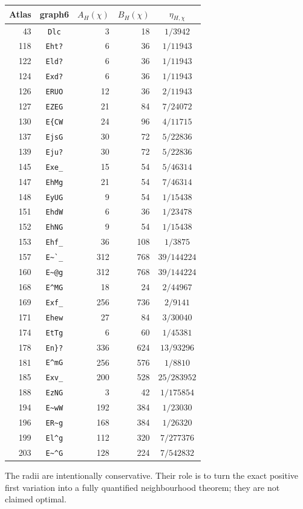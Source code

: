 \documentclass[11pt]{article}
\begin{document}
\begin{center}
\begin{tabular}{r|c|r|r|c}
Atlas&graph6&$A_H(\chi)$&$B_H(\chi)$&$\eta_{H,\chi}$\\ \hline
43&\verb|Dlc|&3&18&$1/3942$\\
118&\verb|Eht?|&6&36&$1/11943$\\
122&\verb|Eld?|&6&36&$1/11943$\\
124&\verb|Exd?|&6&36&$1/11943$\\
126&\verb|ERUO|&12&36&$2/11943$\\
127&\verb|EZEG|&21&84&$7/24072$\\
130&\verb|E{CW|&24&96&$4/11715$\\
137&\verb|EjsG|&30&72&$5/22836$\\
139&\verb|Eju?|&30&72&$5/22836$\\
145&\verb|Exe_|&15&54&$5/46314$\\
147&\verb|EhMg|&21&54&$7/46314$\\
148&\verb|EyUG|&9&54&$1/15438$\\
151&\verb|EhdW|&6&36&$1/23478$\\
152&\verb|EhNG|&9&54&$1/15438$\\
153&\verb|Ehf_|&36&108&$1/3875$\\
157&\verb|E~`_|&312&768&$39/144224$\\
160&\verb|E~@g|&312&768&$39/144224$\\
168&\verb|E^MG|&18&24&$2/44967$\\
169&\verb|Exf_|&256&736&$2/9141$\\
171&\verb|Ehew|&27&84&$3/30040$\\
174&\verb|EtTg|&6&60&$1/45381$\\
178&\verb|En}?|&336&624&$13/93296$\\
181&\verb|E^mG|&256&576&$1/8810$\\
185&\verb|Exv_|&200&528&$25/283952$\\
188&\verb|EzNG|&3&42&$1/175854$\\
194&\verb|E~wW|&192&384&$1/23030$\\
196&\verb|ER~g|&168&384&$1/26320$\\
199&\verb|El^g|&112&320&$7/277376$\\
203&\verb|E~^G|&128&224&$7/542832$
\end{tabular}
\end{center}

The radii are intentionally conservative.  Their role is to turn the exact
positive first variation into a fully quantified neighbourhood theorem;
they are not claimed optimal.
\end{document}
